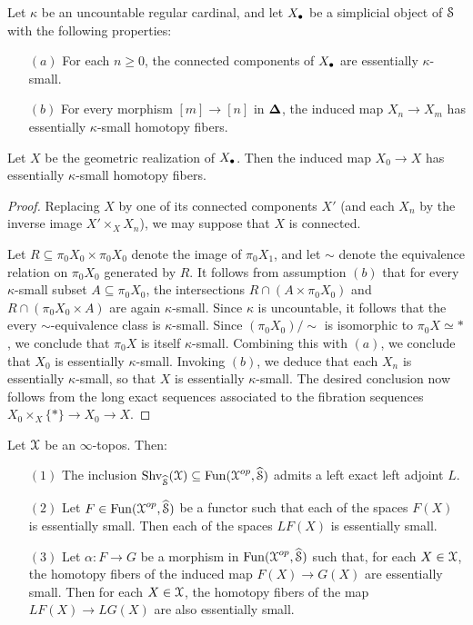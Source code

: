 \begin{lemma}\label{guesstimate}
Let $\kappa$ be an uncountable regular cardinal, and let $X_{\bullet}$ be a simplicial
object of $\operatorname{\mathcal{S}}$ with the following properties:
\begin{itemize}
\item[$(a)$] For each $n \geq 0$, the connected components of $X_{\bullet}$ are essentially $\kappa$-small.
\item[$(b)$] For every morphism $[m] \rightarrow [n]$ in $\operatorname{{\bf \Delta}}$, the induced map
$X_{n} \rightarrow X_{m}$ has essentially $\kappa$-small homotopy fibers.
\end{itemize}
Let $X$ be the geometric realization of $X_{\bullet}$. Then the induced map
$X_0 \rightarrow X$ has essentially $\kappa$-small homotopy fibers.
\end{lemma}

\begin{proof}
Replacing $X$ by one of its connected components $X'$ (and each $X_{n}$ by the
inverse image $X' \times_{X} X_n$), we may suppose that $X$ is connected.

Let $R \subseteq \pi_0 X_0 \times \pi_0 X_0$ denote the image of $\pi_0 X_1$, and let
$\sim$ denote the equivalence relation on $\pi_0 X_0$ generated by $R$. It follows from
assumption $(b)$ that for every $\kappa$-small subset $A \subseteq \pi_0 X_0$, the
intersections $R \cap (A \times \pi_0 X_0)$ and $R \cap (\pi_0 X_0 \times A)$ are
again $\kappa$-small. Since $\kappa$ is uncountable, it follows that the every $\sim$-equivalence class is $\kappa$-small. Since $(\pi_0 X_0)/ \sim$ is isomorphic to $\pi_0 X \simeq \ast$, 
we conclude that $\pi_0 X$ is itself $\kappa$-small. Combining this with $(a)$, we conclude that $X_0$ is essentially $\kappa$-small. Invoking $(b)$, we deduce that
each $X_{n}$ is essentially $\kappa$-small, so that $X$ is essentially $\kappa$-small. The desired conclusion now follows from the long exact sequences associated to the fibration sequences
$X_0 \times_{X} \{\ast\} \rightarrow X_0 \rightarrow X.$
\end{proof}

\begin{lemma}\label{carbcount}
Let $\operatorname{\mathcal{X}}$ be an $\infty$-topos. Then:
\begin{itemize}
\item[$(1)$] The inclusion $\operatorname{Shv}_{ \widehat{\operatorname{\mathcal{S}}}}(\operatorname{\mathcal{X}}) \subseteq \operatorname{Fun}( \operatorname{\mathcal{X}}^{op}, \widehat{\operatorname{\mathcal{S}}})$ admits a left exact left adjoint $L$.
\item[$(2)$] Let $F \in \operatorname{Fun}( \operatorname{\mathcal{X}}^{op}, \widehat{\operatorname{\mathcal{S}}})$ be a functor such that each of the spaces $F(X)$ is essentially small. Then each of the spaces $LF(X)$ is essentially small. 
\item[$(3)$] Let $\alpha: F \rightarrow G$ be a morphism in $\operatorname{Fun}( \operatorname{\mathcal{X}}^{op}, \widehat{\operatorname{\mathcal{S}}})$ such that, for each $X \in \operatorname{\mathcal{X}}$, the homotopy fibers of the induced map $F(X) \rightarrow G(X)$ are essentially small. Then for each $X \in \operatorname{\mathcal{X}}$, the homotopy fibers of the map $LF(X) \rightarrow LG(X)$ are also essentially small.
\end{itemize}
\end{lemma}

